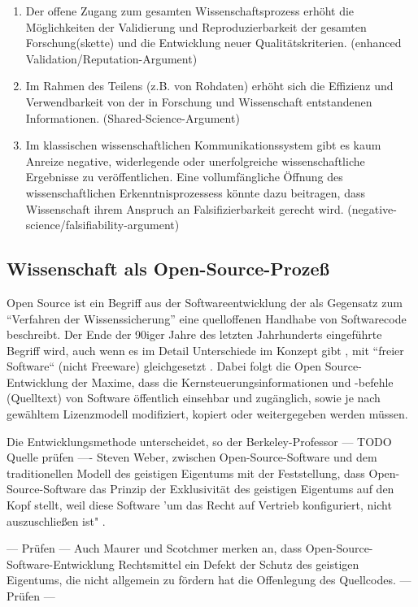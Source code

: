 \begin{enumerate}
\item Der offene Zugang zum gesamten Wissenschaftsprozess erhöht die Möglichkeiten der Validierung und Reproduzierbarkeit der gesamten Forschung(skette) und die Entwicklung neuer Qualitätskriterien. (enhanced Validation/Reputation-Argument)
\item Im Rahmen des Teilens (z.B. von Rohdaten) erhöht sich die Effizienz und Verwendbarkeit von der in Forschung und Wissenschaft entstandenen Informationen. (Shared-Science-Argument)
\item Im klassischen wissenschaftlichen Kommunikationssystem gibt es kaum Anreize negative, widerlegende oder unerfolgreiche wissenschaftliche Ergebnisse zu veröffentlichen. Eine vollumfängliche Öffnung des wissenschaftlichen Erkenntnisprozessess könnte dazu beitragen, dass Wissenschaft ihrem Anspruch an Falsifizierbarkeit gerecht wird. (negative-science/falsifiability-argument)
\end{enumerate}

\subsection{Wissenschaft als Open-Source-Prozeß}

Open Source ist ein Begriff aus der Softwareentwicklung der als Gegensatz zum “Verfahren der Wissenssicherung” \cite{stallman2002} eine quelloffenen Handhabe von Softwarecode beschreibt. Der Ende der 90iger Jahre des letzten Jahrhunderts eingeführte Begriff wird, auch wenn es im Detail Unterschiede im Konzept gibt \cite{suchen}, mit “freier Software“ (nicht Freeware) gleichgesetzt \cite{suchen}. Dabei folgt die Open Source-Entwicklung der Maxime, dass die Kernsteuerungsinformationen und -befehle (Quelltext) von Software öffentlich einsehbar und zugänglich, sowie je nach gewähltem Lizenzmodell modifiziert, kopiert oder weitergegeben werden müssen\cite{suchen}. 

Die Entwicklungsmethode unterscheidet, so der Berkeley-Professor --- TODO Quelle prüfen ---- Steven Weber, zwischen Open-Source-Software und dem traditionellen Modell des geistigen Eigentums mit der Feststellung, dass Open-Source-Software das Prinzip der Exklusivität des geistigen Eigentums auf den Kopf stellt, weil diese Software 'um das Recht auf Vertrieb konfiguriert, nicht auszuschließen ist" \cite{suchen}. 

--- Prüfen ---
Auch Maurer und Scotchmer merken an, dass Open-Source-Software-Entwicklung Rechtsmittel ein Defekt der Schutz des geistigen Eigentums, die nicht allgemein zu fördern hat die Offenlegung des Quellcodes. 
--- Prüfen ---

